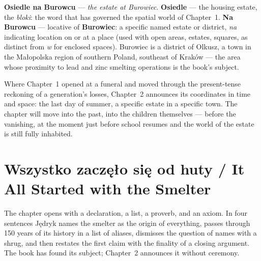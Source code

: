 \textbf{Osiedle na Burowcu} --- \textit{the estate at
Burowiec}. \textbf{Osiedle} --- the housing estate, the
\textit{bloki}: the word that has governed the spatial
world of Chapter~1. \textbf{Na Burowcu} --- locative
of \textbf{Burowiec}: a specific named estate or district,
\textit{na} indicating location on or at a place
(used with open areas, estates, squares, as distinct
from \textit{w} for enclosed spaces). Burowiec is a
district of Olkusz, a town in the Małopolska region
of southern Poland, southeast of Kraków --- the area
whose proximity to lead and zinc smelting operations
is the book's subject.

\medskip
Where Chapter~1 opened at a funeral and moved through
the present-tense reckoning of a generation's losses,
Chapter~2 announces its coordinates in time and space:
the last day of summer, a specific estate in a specific
town. The chapter will move into the past, into the
children themselves --- before the vanishing, at the
moment just before school resumes and the world of the
estate is still fully inhabited.

\section{Wszystko zaczęło się od huty / It All Started with the Smelter}



The chapter opens with a declaration, a list, a proverb,
and an axiom. In four sentences Jędryk names the smelter
as the origin of everything, passes through 150 years of
its history in a list of aliases, dismisses the question
of names with a shrug, and then restates the first claim
with the finality of a closing argument. The book has
found its subject; Chapter~2 announces it without ceremony.

